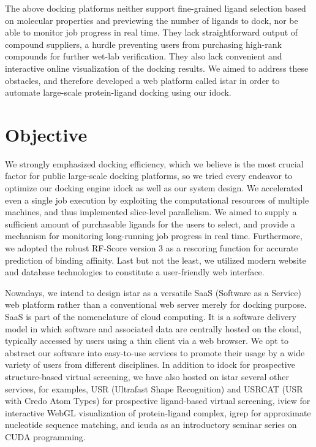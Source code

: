 The above docking platforms neither support fine-grained ligand selection based on molecular properties and previewing the number of ligands to dock, nor be able to monitor job progress in real time. They lack straightforward output of compound suppliers, a hurdle preventing users from purchasing high-rank compounds for further wet-lab verification. They also lack convenient and interactive online visualization of the docking results. We aimed to address these obstacles, and therefore developed a web platform called istar in order to automate large-scale protein-ligand docking using our idock.

\section{Objective}

We strongly emphasized docking efficiency, which we believe is the most crucial factor for public large-scale docking platforms, so we tried every endeavor to optimize our docking engine idock as well as our system design. We accelerated even a single job execution by exploiting the computational resources of multiple machines, and thus implemented slice-level parallelism. We aimed to supply a sufficient amount of purchasable ligands for the users to select, and provide a mechanism for monitoring long-running job progress in real time. Furthermore, we adopted the robust RF-Score \citep{564} version 3 as a rescoring function for accurate prediction of binding affinity. Last but not the least, we utilized modern website and database technologies to constitute a user-friendly web interface.

Nowadays, we intend to design istar as a versatile SaaS (Software as a Service) web platform rather than a conventional web server merely for docking purpose. SaaS is part of the nomenclature of cloud computing. It is a software delivery model in which software and associated data are centrally hosted on the cloud, typically accessed by users using a thin client via a web browser. We opt to abstract our software into easy-to-use services to promote their usage by a wide variety of users from different disciplines. In addition to idock for prospective structure-based virtual screening, we have also hosted on istar several other services, for examples, USR (Ultrafast Shape Recognition) \citep{1379} and USRCAT (USR with Credo Atom Types) \citep{1331} for prospective ligand-based virtual screening, iview \citep{1366} for interactive WebGL visualization of protein-ligand complex, igrep \citep{1138} for approximate nucleotide sequence matching, and icuda as an introductory seminar series on CUDA programming.

